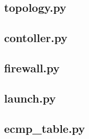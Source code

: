 \subsection{topology.py}
	
	\newpage
\subsection{contoller.py}	
	
	\newpage
\subsection{firewall.py}
	
	\newpage
\subsection{launch.py}
	
	\newpage
\subsection{ecmp\_table.py}
	
